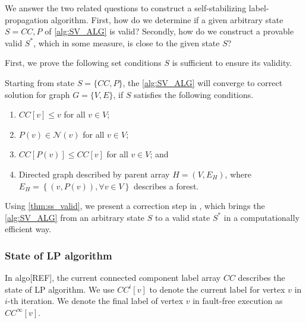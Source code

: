 We answer the two related questions to construct a self-stabilizing label-
propagation algorithm. First, how do we determine if a given arbitrary state
$S={CC, P}$ of \cref{alg:SV_ALG} is valid? Secondly,  how do we construct a
provable valid $S^{*}$, which in some measure, is close to the given state $S$?

First, we prove the following set conditions $S$ is sufficient to ensure its
validity.  
\begin{thm}
\label{thm:ss_valid}
Starting from state $S= \{CC,P \}$, the \cref{alg:SV_ALG} will converge to correct solution for graph $G=\{ V, E\}$, if $S$ satisfies the following conditions.
\begin{enumerate}
\item $CC[v]\leq v$  for all $v\in V$;
\item $P(v)\in\mathcal{N}(v)$ for all $v\in V$;
\item $CC[P(v)]\leq CC[v]$ for all $v\in V$; and 
\item Directed graph described by parent array $H=(V,E_{H})$, where $E_{H}=\left\{ (v,P(v)),\forall v\in V\right\} $
describes a forest. 
\end{enumerate}
\end{thm}
Using \cref{thm:ss_valid}, we present a  correction step in , which brings the
\cref{alg:SV_ALG} from an arbitrary state $S$ to a valid state $S^{*}$ in a
computationally efficient way.





\subsubsection*{State of LP algorithm}

In algo{[}REF{]}, the current connected component label array $CC$
describes the state of LP algorithm. We use $CC^{i}[v]$ to denote
the current label for vertex $v$ in $i$-th iteration. We denote
the final label of vertex $v$ in fault-free execution as $CC^{\infty}[v]$. 

